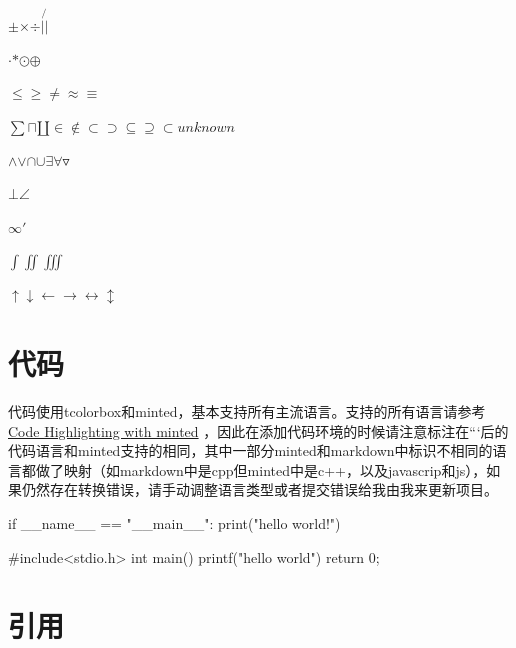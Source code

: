 \documentclass{article}%
\begin{document}
%
$\pm{}$$\times{}$$\div{}$$|{}$$\not{|}{}$%

%
$\cdot{}$${}$$\ast{}$$\odot{}$$\oplus{}$%

%
$\leq{}$$\geq{}$$\neq{}$$\approx{}$$\equiv{}$%

%
$\sum{}$$\sqcap{}$$\amalg{}$$\in{}$$\notin{}$$\subset{}$$\supset{}$$\subseteq{}$$\supseteq{}$$\subset{}$$unknown$%

%
$\wedge{}$$\vee{}$$\cap{}$$\cup{}$$\exists{}$$\forall{}$$\triangledown{}$%

%
$\bot{}$$\angle{}$%

%
$\infty{}$${}$$'{}$%

%
$\int{}$$\iint{}$$\iiint{}$%

%
$\uparrow{}$$\downarrow{}$$\leftarrow{}$$\to{}$$\leftrightarrow{}$$\updownarrow{}$

%

%
%
%

%
\section{代码}%

%
代码使用tcolorbox和minted，基本支持所有主流语言。支持的所有语言请参考 \href{https://www.overleaf.com/learn/latex/Code_Highlighting_with_minted}{Code Highlighting with minted} ，因此在添加代码环境的时候请注意标注在```后的代码语言和minted支持的相同，其中一部分minted和markdown中标识不相同的语言都做了映射（如markdown中是cpp但minted中是c++，以及javascrip和js），如果仍然存在转换错误，请手动调整语言类型或者提交错误给我由我来更新项目。%

%

%
\begin{langbox}[Python]%
if __name__ == "__main__":%
print("hello world!")%
\end{langbox}%

%
%

%

%
\begin{langbox}[C++]%
#include<stdio.h>%
int main(){%
printf("hello world")%
return 0;%
}%
%
\end{langbox}%

%
%
%

%
\section{引用}%

%
\end{document}
